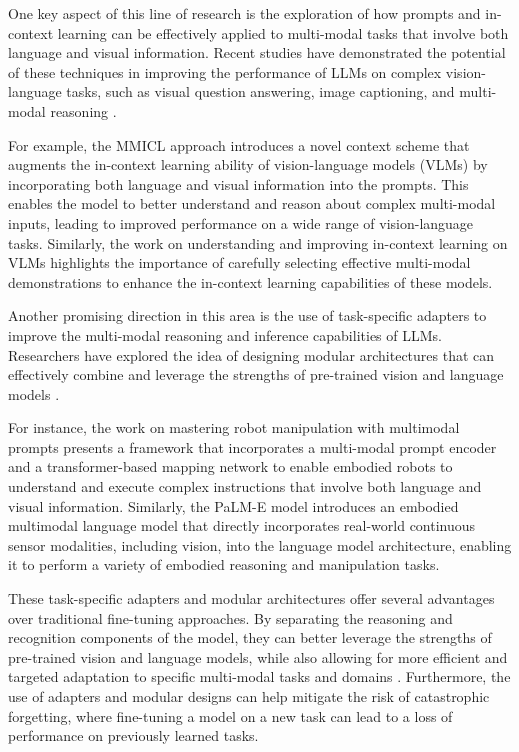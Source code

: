 \documentclass[11pt]{article}
\begin{document}
One key aspect of this line of research is the exploration of how prompts and in-context learning can be effectively applied to multi-modal tasks that involve both language and visual information. Recent studies have demonstrated the potential of these techniques in improving the performance of LLMs on complex vision-language tasks, such as visual question answering, image captioning, and multi-modal reasoning \cite{ref142,ref95}.

For example, the MMICL approach \cite{ref142} introduces a novel context scheme that augments the in-context learning ability of vision-language models (VLMs) by incorporating both language and visual information into the prompts. This enables the model to better understand and reason about complex multi-modal inputs, leading to improved performance on a wide range of vision-language tasks. Similarly, the work on understanding and improving in-context learning on VLMs \cite{ref95} highlights the importance of carefully selecting effective multi-modal demonstrations to enhance the in-context learning capabilities of these models.

Another promising direction in this area is the use of task-specific adapters to improve the multi-modal reasoning and inference capabilities of LLMs. Researchers have explored the idea of designing modular architectures that can effectively combine and leverage the strengths of pre-trained vision and language models \cite{ref143,ref6}.

For instance, the work on mastering robot manipulation with multimodal prompts \cite{ref143} presents a framework that incorporates a multi-modal prompt encoder and a transformer-based mapping network to enable embodied robots to understand and execute complex instructions that involve both language and visual information. Similarly, the PaLM-E model \cite{ref6} introduces an embodied multimodal language model that directly incorporates real-world continuous sensor modalities, including vision, into the language model architecture, enabling it to perform a variety of embodied reasoning and manipulation tasks.

These task-specific adapters and modular architectures offer several advantages over traditional fine-tuning approaches. By separating the reasoning and recognition components of the model, they can better leverage the strengths of pre-trained vision and language models, while also allowing for more efficient and targeted adaptation to specific multi-modal tasks and domains \cite{ref144}. Furthermore, the use of adapters and modular designs can help mitigate the risk of catastrophic forgetting, where fine-tuning a model on a new task can lead to a loss of performance on previously learned tasks.
\end{document}
